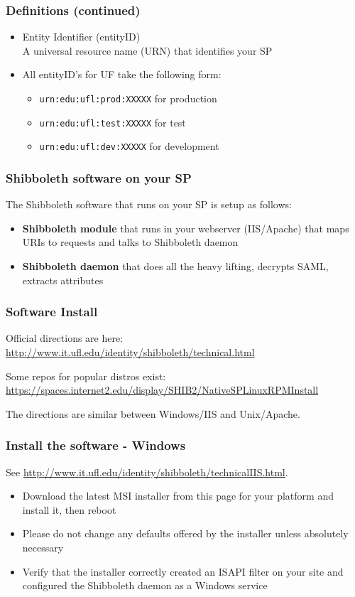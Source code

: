 \begin{frame}
\frametitle{Definitions (continued)}
\begin{itemize}
\item Entity Identifier (entityID) \\ A universal resource name (URN) that identifies your SP
\item All entityID's for UF take the following form: \begin{itemize}
\item \texttt{urn:edu:ufl:prod:XXXXX} for production
\item \texttt{urn:edu:ufl:test:XXXXX} for test
\item \texttt{urn:edu:ufl:dev:XXXXX} for development
\end{itemize}
\end{itemize}
\end{frame}

\begin{frame}
\frametitle{Shibboleth software on your SP}
The Shibboleth software that runs on your SP is setup as follows:
\begin{itemize}
\item \textbf{Shibboleth module} that runs in your webserver (IIS/Apache) that maps URIs to requests and talks to Shibboleth daemon
\item \textbf{Shibboleth daemon} that does all the heavy lifting, decrypts SAML, extracts attributes
\end{itemize}
\end{frame}

\begin{frame}
\frametitle{Software Install}
Official directions are here: \\
{\small \url{http://www.it.ufl.edu/identity/shibboleth/technical.html}}

\bigskip
Some repos for popular distros exist: \\
{\small \url{https://spaces.internet2.edu/display/SHIB2/NativeSPLinuxRPMInstall}}

\bigskip
The directions are similar between Windows/IIS and Unix/Apache.
\end{frame}

\begin{frame}
\frametitle{Install the software - Windows}
{\tiny See \url{http://www.it.ufl.edu/identity/shibboleth/technicalIIS.html}.}

\begin{itemize}
\item Download the latest MSI installer from this page for your platform and install it, then reboot
\item Please do not change any defaults offered by the installer unless absolutely necessary
\item Verify that the installer correctly created an ISAPI filter on your site and configured the Shibboleth daemon as a Windows service
\end{itemize}

\end{frame}

